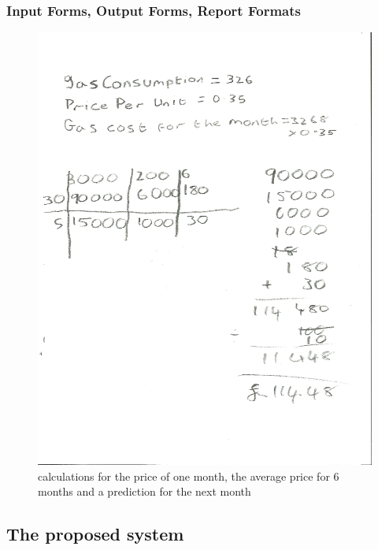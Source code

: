 \subsubsection{Input Forms, Output Forms, Report Formats}
\begin{figure}[H]
    \includegraphics[width=\textwidth]{./untitled.png}
    \caption{calculations for the price of one month, the average price for 6 months and a prediction for the next month} \label{fig:calculations}
\end{figure}
\subsection{The proposed system}

